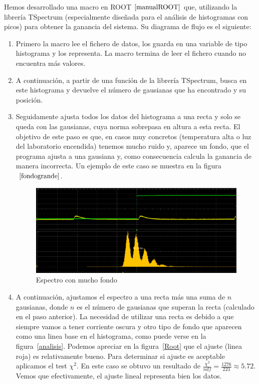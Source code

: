 Hemos desarrollado una macro en ROOT$~\cite{manualROOT}$ que, utilizando la librería TSpectrum (especialmente diseñada para el análisis de histogramas con picos) para obtener la ganancia del sistema. Su diagrama de flujo es el siguiente:
\begin{enumerate}
\item {} Primero la macro lee el fichero de datos, los guarda en una variable de tipo histograma y los representa. La macro termina de leer el fichero cuando no encuentra más valores.

\item {} A continuación, a partir de una función de la librería TSpectrum, busca en este histograma y devuelve el número de gausianas que ha encontrado y su posición.

\item {} Seguidamente ajusta todos los datos del histograma a una recta y solo se queda con las gausianas, cuya norma sobrepasa en altura a esta recta. El objetivo de este paso es que, en casos muy concretos (temperatura alta o luz del laboratorio encendida) tenemos mucho ruido y, aparece un fondo,  que el programa ajusta a una gausiana y, como consecuencia calcula la ganancia de manera incorrecta. Un ejemplo de este caso se muestra en la figura$~\ref{fondogrande}$.

\begin{figure}[hbtp]
\centering
\includegraphics[scale=0.4]{fondogaussiano.png}
\caption{Espectro con mucho fondo\label{fondogrande}}
\end{figure}

\item {} A continuación, ajustamos el espectro a una recta más una suma de $n$ gausianas, donde $n$ es el número de gausianas que superan la recta (calculado en el paso anterior). La necesidad de utilizar una recta es debido a que siempre vamos a tener corriente oscura y otro tipo de fondo que aparecen como una linea base en el histograma, como puede verse en la figura~\ref{analisis}. Podemos apreciar en la figura~\ref{Root} que el ajuste (linea roja) es relativamente bueno. Para determinar si ajuste es aceptable aplicamos el test $\chi^2$. En este caso se obtuvo un resultado de $\frac{\chi^2}{ndf}=\frac{1276}{223}\approx 5.72$. Vemos que efectivamente, el ajuste lineal representa bien los datos.


\end{enumerate}
